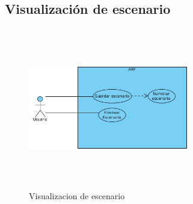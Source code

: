 \begin{enumerate}[1.]
\subsection{Visualización de escenario} 
\begin{figure}[h!]
	\centering
	\includegraphics[width=7cm,height=7cm]{imagenes/analisis/Escenario.jpg}
	\caption{Visualizacion de escenario \cite{B27}}
	\label{fig:analogo}
\end{figure}
\end{enumerate}

